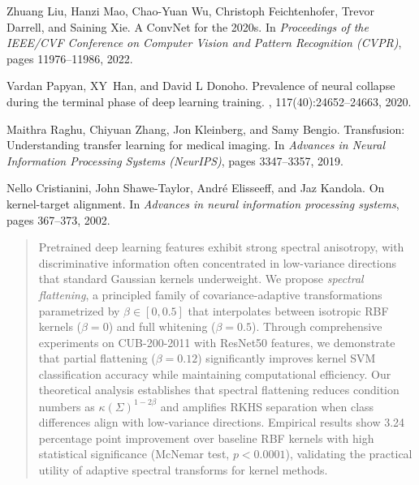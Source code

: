 \documentclass[11pt]{article}
\begin{document}
\begin{thebibliography}{10}
Zhuang Liu, Hanzi Mao, Chao-Yuan Wu, Christoph Feichtenhofer, Trevor Darrell, and Saining Xie.
\newblock A ConvNet for the 2020s.
\newblock In {\em Proceedings of the IEEE/CVF Conference on Computer Vision and Pattern Recognition (CVPR)}, pages 11976--11986, 2022.

Vardan Papyan, XY~Han, and David L Donoho.
\newblock Prevalence of neural collapse during the terminal phase of deep learning training.
, 117(40):24652--24663, 2020.

Maithra Raghu, Chiyuan Zhang, Jon Kleinberg, and Samy Bengio.
\newblock Transfusion: Understanding transfer learning for medical imaging.
\newblock In {\em Advances in Neural Information Processing Systems (NeurIPS)}, pages 3347--3357, 2019.

Nello Cristianini, John Shawe-Taylor, Andr{\'e} Elisseeff, and Jaz Kandola.
\newblock On kernel-target alignment.
\newblock In {\em Advances in neural information processing systems}, pages 367--373, 2002.

\end{thebibliography}



\begin{abstract}
Pretrained deep learning features exhibit strong spectral anisotropy, with discriminative information often concentrated in low-variance directions that standard Gaussian kernels underweight. We propose \emph{spectral flattening}, a principled family of covariance-adaptive transformations parametrized by $\beta \in [0, 0.5]$ that interpolates between isotropic RBF kernels ($\beta=0$) and full whitening ($\beta=0.5$). Through comprehensive experiments on CUB-200-2011 with ResNet50 features, we demonstrate that partial flattening ($\beta = 0.12$) significantly improves kernel SVM classification accuracy while maintaining computational efficiency. Our theoretical analysis establishes that spectral flattening reduces condition numbers as $\kappa(\Sigma)^{1-2\beta}$ and amplifies RKHS separation when class differences align with low-variance directions. Empirical results show 3.24 percentage point improvement over baseline RBF kernels with high statistical significance (McNemar test, $p < 0.0001$), validating the practical utility of adaptive spectral transforms for kernel methods.
\end{abstract}
\end{document}
